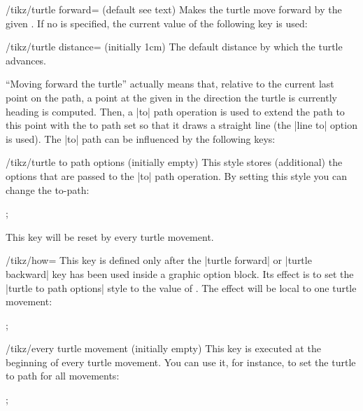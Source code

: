 \begin{key}{/tikz/turtle forward= (default \normalfont see text)}
  Makes the turtle move forward by the given . If no
   is specified, the current value of the following key
  is used:
  \begin{key}{/tikz/turtle distance= (initially 1cm)}
    The default distance by which the turtle advances.
  \end{key}
  ``Moving forward the turtle'' actually means that, relative to the
  current last point on the path, a point at the given 
  in the direction the turtle is currently heading is computed. Then,
  a |to| path operation is used to extend the path to this point with
  the to path set so that it draws a straight line (the |line to|
  option is used). The |to| path can be influenced by the following keys:
  \begin{stylekey}{/tikz/turtle to path options (initially \normalfont empty)}
    This style stores (additional) the options that are passed to the
    |to| path operation. By setting this style you can change the
    to-path: 
\begin{codeexample}[]
\tikz {};
\end{codeexample}    
    This key will be reset by every turtle movement.
  \end{stylekey}
  \begin{key}{/tikz/how=}
    This key is defined only after the |turtle forward| or
    |turtle backward| key has been used inside a graphic option
    block. Its effect is to set the |turtle to path options| style to
    the value of . The effect will be local to one
    turtle movement:
\begin{codeexample}[]
\tikz {};
\end{codeexample}    
  \end{key}
  \begin{stylekey}{/tikz/every turtle movement (initially \normalfont empty)}
    This key is executed at the beginning of every turtle
    movement. You can use it, for instance, to set the turtle to path
    for all movements:
\begin{codeexample}[]
\tikz {};
\end{codeexample}    
  \end{stylekey}
\end{key}

